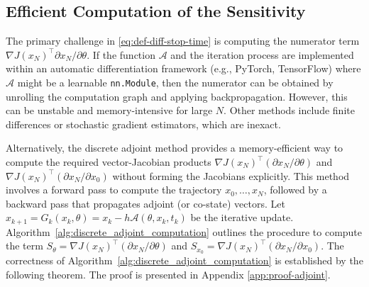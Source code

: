 \documentclass{article}
\newcommand{\Acal}{\mathcal{A}}
\begin{document}
\subsection{Efficient Computation of the Sensitivity}
The primary challenge in \eqref{eq:def-diff-stop-time} is computing the numerator term $\nabla J(x_N)^\top \partial x_N / \partial \theta$. If the function $\Acal$ and the iteration process are implemented within an automatic differentiation framework (e.g., PyTorch, TensorFlow) where $\Acal$ might be a learnable \texttt{nn.Module}, then the numerator can be obtained by unrolling the computation graph and applying backpropagation. However, this can be unstable and memory-intensive for large $N$. Other methods include finite differences or stochastic gradient estimators, which are inexact.

Alternatively, the discrete adjoint method provides a memory-efficient way to compute the required vector-Jacobian products $\nabla J(x_N)^\top (\partial x_N / \partial \theta)$ and $\nabla J(x_N)^\top (\partial x_N / \partial x_0)$ without forming the Jacobians explicitly. This method involves a forward pass to compute the trajectory $x_0, \dots, x_N$, followed by a backward pass that propagates adjoint (or co-state) vectors. Let $x_{k+1} = G_k(x_k, \theta) = x_k - h\Acal(\theta, x_k, t_k)$ be the iterative update. Algorithm~\ref{alg:discrete_adjoint_computation} outlines the procedure to compute the term $S_{\theta} = \nabla J(x_N)^\top (\partial x_N / \partial \theta)$ and $S_{x_0} = \nabla J(x_N)^\top (\partial x_N / \partial x_0)$. The correctness of Algorithm~\ref{alg:discrete_adjoint_computation} is established by the following theorem. The proof is presented in Appendix \ref{app:proof-adjoint}.
\end{document}
